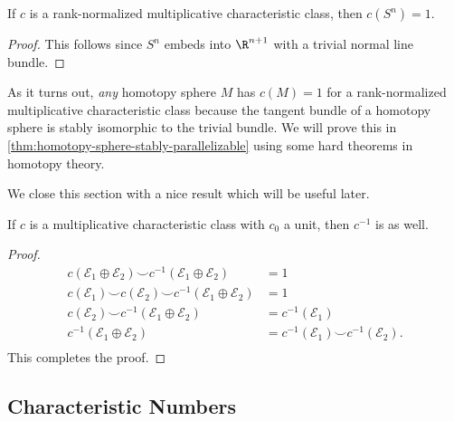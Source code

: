 \begin{corollary}
	If $c$ is a rank-normalized multiplicative characteristic class, then $c(S^n)=1$.
\end{corollary}
\begin{proof}
	This follows since $S^n$ embeds into $\R^{n+1}$ with a trivial normal line bundle.
\end{proof}

\begin{remark}
	As it turns out, \emph{any} homotopy sphere $M$ has $c(M)=1$ for a rank-normalized multiplicative characteristic class because the tangent bundle of a homotopy sphere is stably isomorphic to the trivial bundle. We will prove this in \cref{thm:homotopy-sphere-stably-parallelizable} using some hard theorems in homotopy theory.
\end{remark}

We close this section with a nice result which will be useful later.
\begin{proposition}\label{prop:multiplicative-inverse-is-multiplicative}
	If $c$ is a multiplicative characteristic class with $c_0$ a unit, then $c^{-1}$ is as well.
\end{proposition}
\begin{proof}
	\begin{equation}
		\begin{aligned}
			c(\mathcal{E}_1\oplus \mathcal{E}_2)\smile c^{-1}(\mathcal{E}_1\oplus \mathcal{E}_2)    & = 1                                                  \\
			c(\mathcal{E}_1)\smile c(\mathcal{E}_2)\smile c^{-1}(\mathcal{E}_1\oplus \mathcal{E}_2) & = 1                                                  \\
			c(\mathcal{E}_2)\smile
			c^{-1}(\mathcal{E}_1\oplus \mathcal{E}_2)                                               & = c^{-1}(\mathcal{E}_1)                              \\
			c^{-1}(\mathcal{E}_1\oplus \mathcal{E}_2)                                               & = c^{-1}(\mathcal{E}_1)\smile c^{-1}(\mathcal{E}_2). \\
		\end{aligned}
	\end{equation}
	This completes the proof.
\end{proof}

\subsection{Characteristic Numbers}

